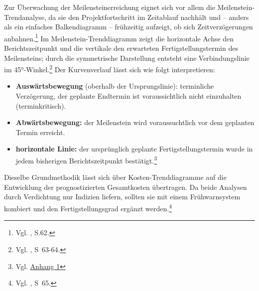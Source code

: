 \documentclass[
    12pt, 
    a4paper,
    ]{scrartcl} %
\begin{document}
Zur Überwachung der Meilensteinerreichung eignet sich vor allem die Meilenstein-Trendanalyse, da sie den Projektfortschritt im Zeitablauf nachhält und – anders als ein einfaches Balkendiagramm – frühzeitig aufzeigt, ob sich Zeitverzögerungen anbahnen.\footnote{Vgl. \cite{Nobach_Projektcontrolling}, S.62.} Im Meilenstein-Trenddiagramm zeigt die horizontale Achse den Berichtszeitpunkt und die vertikale den erwarteten Fertigstellungstermin des Meilensteins; durch die symmetrische Darstellung entsteht eine Verbindungslinie im 45°-Winkel.\footnote{Vgl. \cite{Nobach_Projektcontrolling}, S~63-64.}
Der Kurvenverlauf lässt sich wie folgt interpretieren:
\begin{itemize}
    \setlength\itemsep{0.4\baselineskip}
    \setlength\parskip{0pt}
    \setlength\parsep{0pt}
    \item \textbf{Auswärtsbewegung} (oberhalb der Ursprungslinie): terminliche Verzögerung, der geplante Endtermin ist voraussichtlich nicht einzuhalten (terminkritisch).
    \item \textbf{Abwärtsbewegung:} der Meilenstein wird voraussuchtlich vor dem geplanten Termin erreicht.
    \item \textbf{horizontale Linie:} der ursprünglich geplante Fertigstellungstermin wurde in jedem bisherigen Berichtszeitpunkt bestätigt.\footnote{Vgl. \hyperref[sec:Anhang1]{Anhang 1}}
\end{itemize}
Dieselbe Grundmethodik lässt sich über Kosten-Trenddiagramme auf die Entwicklung der prognostizierten Gesamtkosten übertragen. Da beide Analysen durch Verdichtung nur Indizien liefern, sollten sie mit einem Frühwarnsystem kombiert und den Fertigstellungsgrad ergänzt werden.\footnote{Vgl. \cite{Nobach_Projektcontrolling}, S~65.}
\end{document}
